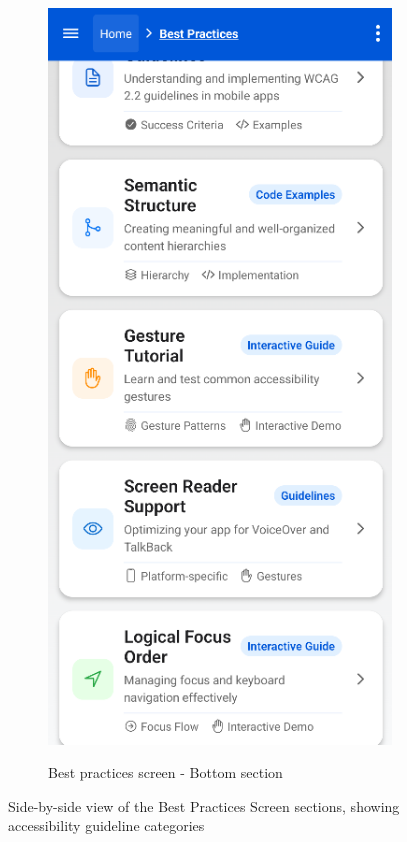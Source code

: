 \begin{figure}[ht]
\begin{subfigure}[b]{0.48\textwidth}
        \label{fig:best-practices-top}
    \end{subfigure}
    \hfill
    \begin{subfigure}[b]{0.48\textwidth}
        \centering
        \includegraphics[width=\linewidth, alt={Second part of the Best Practices Screen}]{img/practices2.png}
        \caption{Best practices screen - Bottom section}
        \label{fig:best-practices-bottom}
    \end{subfigure}
    \caption{Side-by-side view of the Best Practices Screen sections, showing accessibility guideline categories}
    \label{fig:best_practices_screens_sidebyside}
\end{figure}

